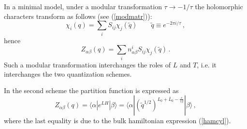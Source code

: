 \documentclass[a4paper,12pt]{report}
\begin{document}
In a minimal model, under a modular transformation $\tau \rightarrow -1/\tau$ the holomorphic characters transform
as follows (see (\ref{modmatr})):
\begin{equation}
\chi_{i}(q)=\sum_{i}S_{ij}\chi_{j}(\tilde{q})\qquad \tilde{q}\equiv e^{-2\pi i/\tau}\,,
\end{equation}
hence
\begin{equation}\label{schemes}
Z_{\alpha\beta}(q)=\sum_{i}n_{\alpha\beta}^{i}S_{ij}\chi_{j}(\tilde{q})\,.
\end{equation}
Such a modular transformation interchanges the roles of $L$ and $T$, i.e. it interchanges the two quantization
schemes.

In the second scheme the partition function is expressed as
\begin{equation}
Z_{\alpha\beta}(q)=\langle\alpha|e^{LH}|\beta\rangle=\langle\alpha|\left(\tilde{q}^{1/2}\right)^{L_{0}+\bar{L}_{0}-\frac{c}{12}}|\beta\rangle
\,,
\end{equation}
where the last equality is due to the bulk hamiltonian expression (\ref{hamcyl}).
\end{document}
